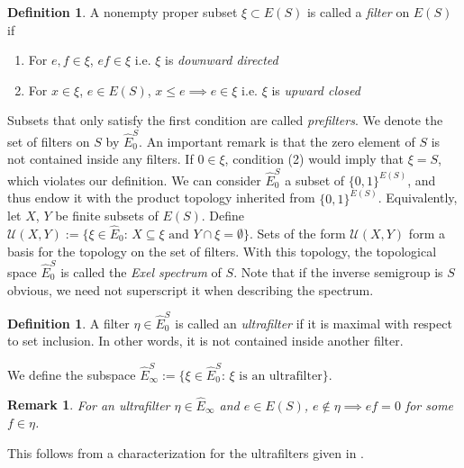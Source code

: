 \documentclass[12pt]{article}
\newtheorem{remark}[theorem]{Remark}
\theoremstyle{definition}
\newtheorem{definition}[theorem]{Definition}
\begin{document}
\begin{definition}
    A nonempty proper subset $\xi \subset E(S)$ is called a \emph{filter} on $E(S)$ if
    \begin{enumerate}
        \item For $e, f \in \xi$, $ef \in \xi$ \quad i.e. $\xi$ is \emph{downward directed}
        \item For $x \in \xi$, $e \in E(S)$, $x \leq e \implies e \in \xi$ \quad i.e. $\xi$ is \emph{upward closed}
    \end{enumerate}
\end{definition}
Subsets that only satisfy the first condition are called \emph{prefilters}.
We denote the set of filters on $S$ by $\hat{E}_0^S$. 
An important remark is that the zero element of $S$ is not contained 
inside any filters. If $0 \in \xi$, condition (2) would imply that $\xi = S$,
which violates our definition. We can consider $\hat{E}_0^S$ a subset of $\{0, 1\}^{E(S)}$,
and thus endow it with the product topology inherited from $\{0, 1\}^{E(S)}$. Equivalently,
let $X$, $Y$ be finite subsets of $E(S)$. Define $\mathcal{U}(X, Y) := \{\xi \in \hat{E}_0\text{: } X \subseteq \xi \text{ and } Y \cap \xi = \emptyset\}$.
Sets of the form $\mathcal{U}(X, Y)$ form a basis for the topology on the set of filters. With this topology, the topological
space $\hat{E}_0^S$ is called the \emph{Exel spectrum} of $S$. Note that if the inverse semigroup is $S$ obvious, we need not superscript it when describing the spectrum.

\begin{definition}
    A filter $\eta \in \hat{E}_0^S$ is called an \emph{ultrafilter} if it is 
    maximal with respect to set inclusion. In other words, it is not contained
    inside another filter.
\end{definition}
We define the subspace $\hat{E}_\infty^S := \{\xi \in \hat{E}_0^S\text{: $\xi$ is an ultrafilter}\}$.

\begin{remark} For an ultrafilter $\eta \in \hat{E}_\infty$ and $e \in E(S)$, $e \notin \eta \implies ef = 0$ for some $f \in \eta$. \end{remark}
This follows from a characterization for the ultrafilters given in \parencite[Lemma 12.3]{exel}.
\end{document}
